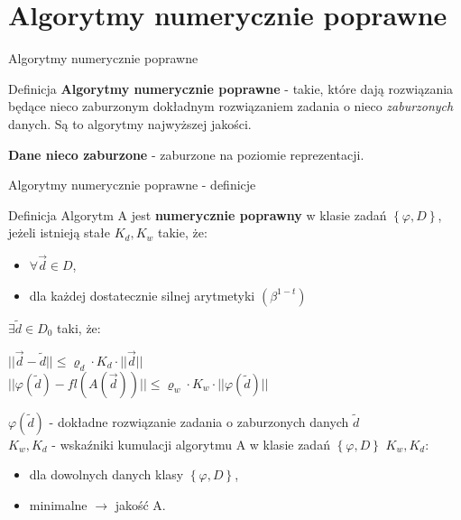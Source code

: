$  $\section{Algorytmy numerycznie poprawne}
\begin{frame}{Algorytmy numerycznie poprawne}
	\begin{block}{Definicja}
		{\bf Algorytmy numerycznie poprawne} - takie, które dają rozwiązania będące nieco zaburzonym dokładnym rozwiązaniem zadania o nieco {\it zaburzonych} danych. Są to algorytmy najwyższej jakości.
        
        {\bf Dane nieco zaburzone} - zaburzone na poziomie reprezentacji.
	\end{block}
\end{frame}
\begin{frame}{Algorytmy numerycznie poprawne - definicje}
	\begin{block}{Definicja}
    	Algorytm A jest {\bf numerycznie poprawny} w klasie zadań $\left\{ \varphi, D \right\}$, jeżeli istnieją stałe $K_d, K_w$ takie, że:
        \begin{itemize}
        	\item $\forall \vec{d} \in D$,
            \item dla każdej dostatecznie silnej arytmetyki $\left( \beta^{1-t} \right)$
        \end{itemize}
        $\exists \tilde{d} \in D_0$ taki, że:
        
        {\centering
        	$|| \vec{d} - \tilde{d} || \le \varrho_d \cdot K_d \cdot || \vec{d} ||$ \\ \vspace{.1cm}
            $|| \varphi(\tilde{d}) - fl(A(\vec{d})) || \le \varrho_w \cdot K_w \cdot || \varphi(\tilde{d}) ||$ \\}

        $\varphi(\tilde{d})$ - dokładne rozwiązanie zadania o zaburzonych danych $\tilde{d}$ \\
        $K_w, K_d$ - wskaźniki kumulacji algorytmu A w klasie zadań $\left\{\varphi, D\right\}$
        $K_w, K_d$:
        \begin{itemize}
        	\item dla dowolnych danych klasy $\left\{ \varphi, D \right\}$,
            \item minimalne $\rightarrow$ jakość A.
        \end{itemize}
	\end{block}
\end{frame}
